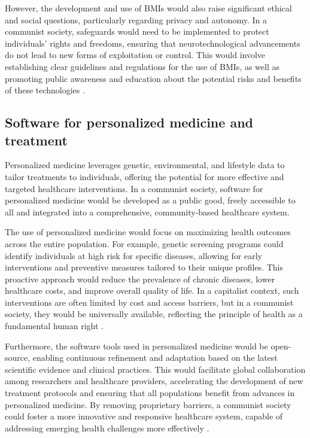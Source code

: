 However, the development and use of BMIs would also raise significant ethical and social questions, particularly regarding privacy and autonomy. In a communist society, safeguards would need to be implemented to protect individuals' rights and freedoms, ensuring that neurotechnological advancements do not lead to new forms of exploitation or control. This would involve establishing clear guidelines and regulations for the use of BMIs, as well as promoting public awareness and education about the potential risks and benefits of these technologies \cite[pp.~310-315]{thompson2022bmi}.

\subsection{Software for personalized medicine and treatment}

Personalized medicine leverages genetic, environmental, and lifestyle data to tailor treatments to individuals, offering the potential for more effective and targeted healthcare interventions. In a communist society, software for personalized medicine would be developed as a public good, freely accessible to all and integrated into a comprehensive, community-based healthcare system.

The use of personalized medicine would focus on maximizing health outcomes across the entire population. For example, genetic screening programs could identify individuals at high risk for specific diseases, allowing for early interventions and preventive measures tailored to their unique profiles. This proactive approach would reduce the prevalence of chronic diseases, lower healthcare costs, and improve overall quality of life. In a capitalist context, such interventions are often limited by cost and access barriers, but in a communist society, they would be universally available, reflecting the principle of health as a fundamental human right \cite[pp.~330-335]{williams2020personalized}.

Furthermore, the software tools used in personalized medicine would be open-source, enabling continuous refinement and adaptation based on the latest scientific evidence and clinical practices. This would facilitate global collaboration among researchers and healthcare providers, accelerating the development of new treatment protocols and ensuring that all populations benefit from advances in personalized medicine. By removing proprietary barriers, a communist society could foster a more innovative and responsive healthcare system, capable of addressing emerging health challenges more effectively \cite[pp.~360-365]{martinez2022collaborative}.

